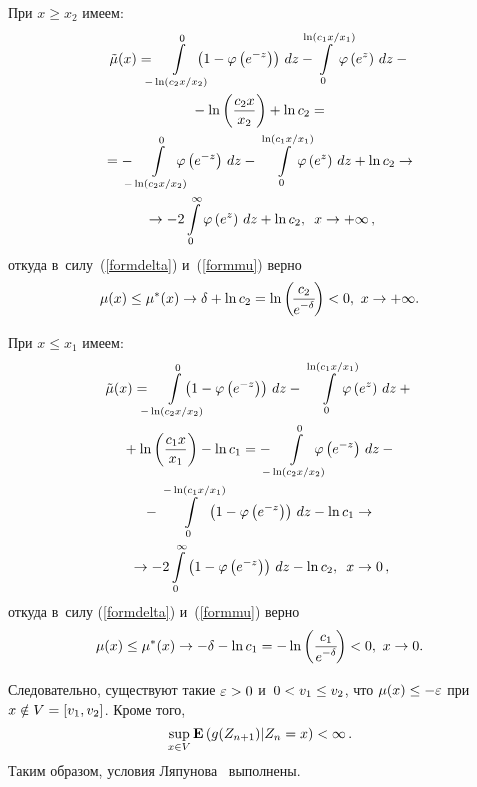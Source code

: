 \begin{multicols}{2}
При $x\ge x_2$ имеем:
\begin{multline*}
{\tilde\mu}(x)=\hspace*{-2mm}\int\limits_{-\ln(c_2x/x_2)}^0\hspace*{-4mm}
\left(1-\varphi\left(e^{-z}\right)\right)\,dz-\hspace*{-4mm}
\int\limits_0^{\ln(c_1x/x_1)}\hspace*{-4mm}\varphi\left(e^z\right)\,dz-{}\\
{}-
\ln\left(\fr{c_2x}{x_2}\right)+\ln c_2={}\\
{}=-\hspace*{-2mm}\int\limits_{-\ln(c_2x/x_2)}^0\hspace*{-4mm}\varphi\left(e^{-z}\right)\,dz-
\int\limits_0^{\ln(c_1x/x_1)}\hspace*{-4mm}\varphi\left(e^z\right)\,dz+
\ln c_2\to{}\\
{}\to -2\int\limits_0^\infty \varphi\left(e^z\right)\,dz+\ln c_2,\enskip
 x\to+\infty\,,
\end{multline*}
откуда в~силу~(\ref{formdelta}) и~(\ref{formmu}) верно
$$
\mu(x)\hm\le\mu^*(x)\to\delta+\ln c_2=\ln \left(\!\fr{c_2}{e^{-\delta}}\!\right)<0, \
x\to +\infty.
$$

При $x\le x_1$ имеем:
\begin{multline*}
{\tilde\mu}(x)=\hspace*{-2mm}\int\limits_{-\ln\left({c_2x}/{x_2}\right)}^0
\hspace*{-6mm}\left(1-\varphi\left(e^{-z}\right)\right)\,dz-
\int\limits_0^{\ln(c_1x/x_1)}\hspace*{-4mm}\varphi\left(e^z\right)\,dz+{}\\
{}+
\ln\left(\fr{c_1x}{x_1}\right)-\ln c_1=
-\hspace*{-2mm}\int\limits_{-\ln(c_2x/x_2)}^0\hspace*{-4mm}\varphi\left(e^{-z}\right)\,dz-{}\\
{}-
\int\limits_0^{-\ln(c_1x/x_1)}\hspace*{-4mm}
\left(1-\varphi\left(e^{-z}\right)\right)\,dz-\ln c_1\to{}\\
{}\to -2\int\limits_0^\infty
\left(1-\varphi\left(e^{-z}\right)\right)\,dz-\ln c_2,\enskip x\to 0\,,
\end{multline*}
откуда в~силу (\ref{formdelta}) и~(\ref{formmu}) верно
$$
\mu(x)\le\mu^*(x)\to -\delta-\ln c_1=-\ln \left(\displaystyle\frac{\displaystyle c_1\mathstrut}{\displaystyle e^{-\delta}\mathstrut}\!\right)<0,\
x\to 0.
$$

Следовательно, существуют такие $\varepsilon\hm>0$
и~$0\hm<v_1\hm\le v_2$, что $\mu(x)\hm\le-\varepsilon$ при $x\hm\notin V\hm=[v_1,v_2]$.
Кроме того, 
$$
\sup\limits_{x\in V}{\bf E}\left(g(Z_{n+1})|Z_n=x\right)<\infty\,.
$$
 Таким
образом, условия Ляпунова~\cite[\S~4.2]{Borov} выполнены.


\end{multicols}

